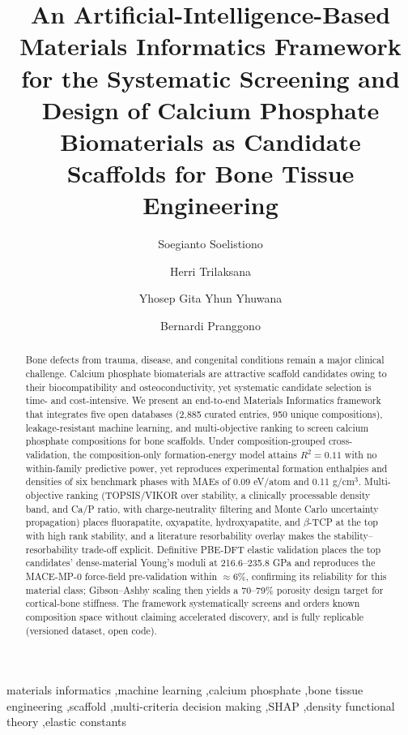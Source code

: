 \documentclass[review,11pt,a4paper]{elsarticle}
\begin{document}
\begin{frontmatter}

\title{An Artificial-Intelligence-Based Materials Informatics Framework for the Systematic Screening and Design of Calcium Phosphate Biomaterials as Candidate Scaffolds for Bone Tissue Engineering}

\author[unair]{Soegianto Soelistiono}
\author[unair]{Herri Trilaksana}
\author[unair]{Yhosep Gita Yhun Yhuwana}
\author[aru]{Bernardi Pranggono}



\begin{abstract}
Bone defects from trauma, disease, and congenital conditions remain a major clinical challenge. Calcium phosphate biomaterials are attractive scaffold candidates owing to their biocompatibility and osteoconductivity, yet systematic candidate selection is time- and cost-intensive. We present an end-to-end Materials Informatics framework that integrates five open databases (2{,}885 curated entries, 950 unique compositions), leakage-resistant machine learning, and multi-objective ranking to screen calcium phosphate compositions for bone scaffolds. Under composition-grouped cross-validation, the composition-only formation-energy model attains $R^2 = 0.11$ with no within-family predictive power, yet reproduces experimental formation enthalpies and densities of six benchmark phases with MAEs of 0.09 eV/atom and 0.11 g/cm$^3$. Multi-objective ranking (TOPSIS/VIKOR over stability, a clinically processable density band, and Ca/P ratio, with charge-neutrality filtering and Monte Carlo uncertainty propagation) places fluorapatite, oxyapatite, hydroxyapatite, and $\beta$-TCP at the top with high rank stability, and a literature resorbability overlay makes the stability--resorbability trade-off explicit. Definitive PBE-DFT elastic validation places the top candidates' dense-material Young's moduli at 216.6--235.8 GPa and reproduces the MACE-MP-0 force-field pre-validation within $\approx$6\%, confirming its reliability for this material class; Gibson--Ashby scaling then yields a 70--79\% porosity design target for cortical-bone stiffness. The framework systematically screens and orders known composition space without claiming accelerated discovery, and is fully replicable (versioned dataset, open code).

\end{abstract}

\begin{keyword}
materials informatics \sep machine learning \sep calcium phosphate \sep bone tissue engineering \sep scaffold \sep multi-criteria decision making \sep SHAP \sep density functional theory \sep elastic constants
\end{keyword}
\end{frontmatter}
\end{document}
